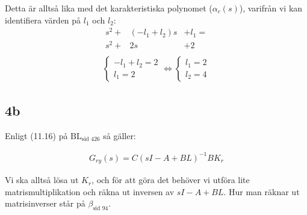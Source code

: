 \documentclass[a4paper]{article}
\newcommand{\mhb}[1]{$\beta_{\text{#1}}$}     %
\newcommand{\bl}[1]{$\text{BL}_{\text{#1}}$}  %
\begin{document}
Detta är alltså lika med det karakteristiska polynomet ($\alpha_c(s)$), varifrån vi kan identifiera värden på $l_1$ och $l_2$:
%
\begin{eqnarray*}
  s^2 + &(-l_1 + l_2)s &+ l_1 = \\
  s^2 + &2s &+ 2\\
\end{eqnarray*}
\vspace{-10mm}
\begin{align*}
  \left\{ \begin{array}{ll}
  -l_1 + l_2 = 2\\
  l_1 = 2
  \end{array} \right. \Longleftrightarrow
  \left\{ \begin{array}{ll}
  l_1 = 2\\
  l_2 = 4
  \end{array} \right.
\end{align*}



\subsection{4b}
Enligt (11.16) på \bl{sid 426} så gäller:

\begin{align*}
  G_{ry}(s) = C(sI - A + BL)^{-1}BK_r
\end{align*}

Vi ska alltså lösa ut $K_r$, och för att göra det behöver vi utföra lite matrismultiplikation och räkna ut inversen av $sI - A + BL$. Hur man räknar ut matrisinverser står på \mhb{sid 94}.
\end{document}
